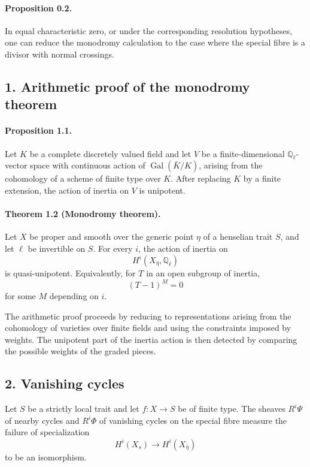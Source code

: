 \documentclass[12pt]{article}
\newcommand{\QQ}{\mathbb Q}
\newcommand{\Gal}{\operatorname{Gal}}
\begin{document}
\paragraph{Proposition 0.2.}
In equal characteristic zero, or under the corresponding resolution hypotheses, one can reduce the monodromy calculation to the case where the special fibre is a divisor with normal crossings.

\subsection*{1. Arithmetic proof of the monodromy theorem}

\paragraph{Proposition 1.1.}
Let $K$ be a complete discretely valued field and let $V$ be a finite-dimensional $\QQ_\ell$-vector space with continuous action of $\Gal(\bar K/K)$, arising from the cohomology of a scheme of finite type over $K$. After replacing $K$ by a finite extension, the action of inertia on $V$ is unipotent.

\paragraph{Theorem 1.2 (Monodromy theorem).}
Let $X$ be proper and smooth over the generic point $\eta$ of a henselian trait $S$, and let $\ell$ be invertible on $S$. For every $i$, the action of inertia on
\[
H^i(X_{\bar\eta},\QQ_\ell)
\]
is quasi-unipotent. Equivalently, for $T$ in an open subgroup of inertia,
\[
(T-1)^M=0
\]
for some $M$ depending on $i$.

The arithmetic proof proceeds by reducing to representations arising from the cohomology of varieties over finite fields and using the constraints imposed by weights. The unipotent part of the inertia action is then detected by comparing the possible weights of the graded pieces.

\subsection*{2. Vanishing cycles}

Let $S$ be a strictly local trait and let $f:X\to S$ be of finite type. The sheaves $R^i\Psi$ of nearby cycles and $R^i\Phi$ of vanishing cycles on the special fibre measure the failure of specialization
\[
H^i(X_s)\to H^i(X_{\bar\eta})
\]
to be an isomorphism.
\end{document}
